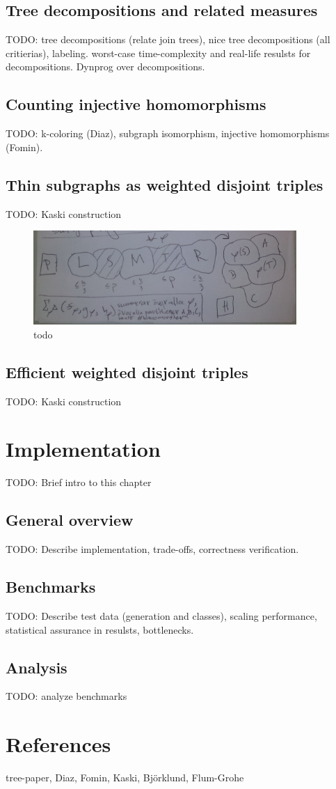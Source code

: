 \documentclass[a4paper,11pt,notitlepage]{report}
\theoremstyle{plain}
\theoremstyle{definition}
\begin{document}
\section{Tree decompositions and related measures}
TODO: tree decompositions (relate join trees), nice tree decompositions (all
critierias), labeling.
worst-case time-complexity and real-life resulsts for decompositions.
Dynprog over decompositions.

\section{Counting injective homomorphisms}
TODO: k-coloring (Diaz), subgraph isomorphism, injective homomorphisms (Fomin).

\section{Thin subgraphs as weighted disjoint triples}
TODO: Kaski construction

\begin{figure}[here]
\centering
\includegraphics[width=10cm]{images/sketch_homo.png} 
\caption[todo]{todo}
\label{fig:homo-viz}
\end{figure}

\section{Efficient weighted disjoint triples}
TODO: Kaski construction


\chapter{Implementation}
TODO: Brief intro to this chapter

\section{General overview}
TODO: Describe implementation, trade-offs, correctness verification.

\section{Benchmarks}
TODO: Describe test data (generation and classes), scaling performance,
statistical assurance in resulsts, bottlenecks.

\section{Analysis}
TODO: analyze benchmarks

\chapter*{References}

tree-paper,
Diaz,
Fomin,
Kaski,
Björklund,
Flum-Grohe
\end{document}
